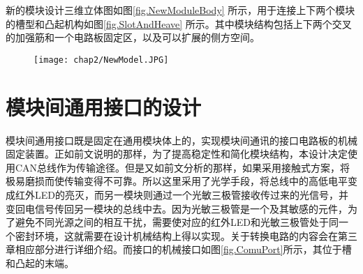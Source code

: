 新的模块设计三维立体图如图\ref{fig.NewModuleBody} 所示，用于连接上下两个模块的槽型和凸起机构如图\ref{fig.SlotAndHeave} 所示。其中模块结构包括上下两个交叉的加强筋和一个电路板固定区，以及可以扩展的侧方空间。
\begin{figure}[!htp]
  \centering
  \texttt{[image: chap2/NewModel.JPG]}
\end{figure}
\begin{figure}
  \centering
\end{figure}
\section{模块间通用接口的设计}
模块间通用接口既是固定在通用模块体上的，实现模块间通讯的接口电路板的机械固定装置。正如前文说明的那样，为了提高稳定性和简化模块结构，本设计决定使用CAN总线作为传输途径。但是又如前文分析的那样，如果采用接触式方案，将极易磨损而使传输变得不可靠。所以这里采用了光学手段，将总线中的高低电平变成红外LED的亮灭，而另一模块则通过一个光敏三极管接收传过来的光信号，并变回电信号传回另一模块的总线中去。因为光敏三极管是一个及其敏感的元件，为了避免不同光源之间的相互干扰，需要使对应的红外LED和光敏三极管处于同一个密封环境，这就需要在设计机械结构上得以实现。关于转换电路的内容会在第三章相应部分进行详细介绍。而接口的机械接口如图\ref{fig.ComuPort}所示，其位于槽和凸起的末端。
\begin{figure}
  \centering
\end{figure}
